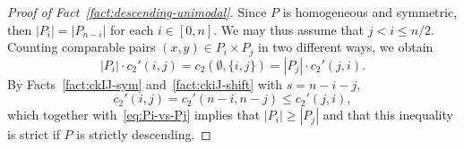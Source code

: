 \documentclass[11pt,a4paper,reqno]{amsart}
\numberwithin{claim}{thm}
\theoremstyle{definition}
\renewcommand{\le}{\leqslant}
\renewcommand{\ge}{\geqslant}
\begin{document}
\begin{proof}[Proof of Fact~\ref{fact:descending-unimodal}]
  Since $P$ is homogeneous and symmetric, then $|P_i| = |P_{n-i}|$ for each $i \in [0,n]$. We may thus assume that $j < i \le n/2$. Counting comparable pairs $(x,y) \in P_i \times P_j$ in two different ways, we obtain
  \begin{equation}
    \label{eq:Pi-vs-Pj}
    |P_i| \cdot c_2'(i, j) = c_2(\emptyset, \{i,j\}) = |P_j| \cdot c_2'(j, i).
  \end{equation}
  By Facts~\ref{fact:ckIJ-sym} and~\ref{fact:ckiJ-shift} with $s = n - i - j$,
  \[
    c_2'(i, j) = c_2'(n-i, n-j) \le c_2'(j, i),
  \]
  which together with~\eqref{eq:Pi-vs-Pj} implies that $|P_i| \ge |P_j|$ and that this inequality is strict if $P$ is strictly descending.
\end{proof}
\end{document}
